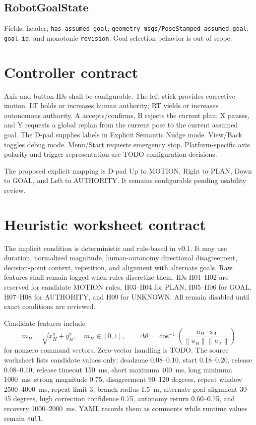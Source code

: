 \documentclass[11pt]{article}
\begin{document}
\subsection{RobotGoalState}
Fields: header; \texttt{has\_assumed\_goal};
\texttt{geometry\_msgs/PoseStamped assumed\_goal}; \texttt{goal\_id}; and
monotonic \texttt{revision}. Goal selection behavior is out of scope.

\section{Controller contract}
Axis and button IDs shall be configurable. The left stick provides corrective
motion. LT holds or increases human authority; RT yields or increases autonomous
authority. A accepts/confirms, B rejects the current plan, X pauses, and Y
requests a global replan from the current pose to the current assumed goal. The
D-pad supplies labels in Explicit Semantic Nudge mode. View/Back toggles debug
mode. Menu/Start requests emergency stop. Platform-specific axis polarity and
trigger representation are TODO configuration decisions.

The proposed explicit mapping is D-pad Up to MOTION, Right to PLAN, Down to
GOAL, and Left to AUTHORITY. It remains configurable pending usability review.

\section{Heuristic worksheet contract}
The implicit condition is deterministic and rule-based in v0.1. It may use
duration, normalized magnitude, human-autonomy directional disagreement,
decision-point context, repetition, and alignment with alternate goals. Raw
features shall remain logged when rules discretize them. IDs H01--H02 are
reserved for candidate MOTION rules, H03--H04 for PLAN, H05--H06 for GOAL,
H07--H08 for AUTHORITY, and H09 for UNKNOWN. All remain disabled until exact
conditions are reviewed.

Candidate features include
\[
m_H=\sqrt{x_H^2+y_H^2},\quad m_H\in[0,1],
\qquad
\Delta\theta=\cos^{-1}\left(
\frac{u_H\cdot u_A}{\lVert u_H\rVert\lVert u_A\rVert}\right)
\]
for nonzero command vectors. Zero-vector handling is TODO. The source worksheet
lists candidate values only: deadzone 0.08--0.10, start 0.18--0.20, release
0.08--0.10, release timeout 150~ms, short maximum 400~ms, long minimum
1000~ms, strong magnitude 0.75, disagreement 90--120 degrees, repeat window
2500--4000~ms, repeat limit 3, branch radius 1.5~m, alternate-goal alignment
30--45 degrees, high correction confidence 0.75, autonomy return 0.60--0.75,
and recovery 1000--2000~ms. YAML records them as comments while runtime values
remain \texttt{null}.
\end{document}
